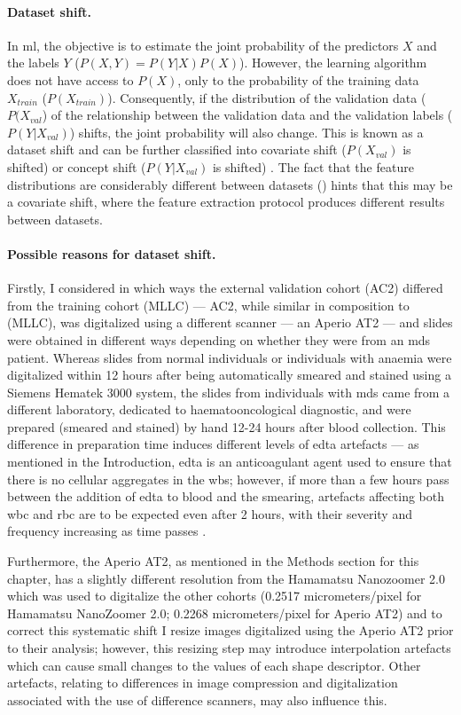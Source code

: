 \paragraph{Dataset shift.} In \ac{ml}, the objective is to estimate the joint probability of the predictors $X$ and the labels $Y$ ($P(X,Y)=P(Y|X)P(X)$). However, the learning algorithm does not have access to $P(X)$, only to the probability of the training data $X_{train}$ ($P(X_{train})$). Consequently, if the distribution of the validation data ($P(X_{val}$) of the relationship between the validation data and the validation labels ($P(Y|X_{val})$) shifts, the joint probability will also change. This is known as a dataset shift and can be further classified into covariate shift ($P(X_{val})$ is shifted) or concept shift ($P(Y|X_{val})$ is shifted) \cite{Y2019-vc}. The fact that the feature distributions are considerably different between datasets () hints that this may be a covariate shift, where the feature extraction protocol produces different results between datasets.

\paragraph{Possible reasons for dataset shift.} Firstly, I considered in which ways the external validation cohort (AC2) differed from the training cohort (MLLC) --- AC2, while similar in composition to (MLLC), was digitalized using a different scanner --- an Aperio AT2 --- and slides were obtained in different ways depending on whether they were from an \ac{mds} patient. Whereas slides from normal individuals or individuals with anaemia were digitalized within 12 hours after being automatically smeared and stained using a Siemens Hematek 3000 system, the slides from individuals with \ac{mds} came from a different laboratory, dedicated to haematooncological diagnostic, and were prepared (smeared and stained) by hand 12-24 hours after blood collection. This difference in preparation time induces different levels of \ac{edta} artefacts --- as mentioned in the Introduction, \ac{edta} is an anticoagulant agent used to ensure that there is no cellular aggregates in the \ac{wbs}; however, if more than a few hours pass between the addition of \ac{edta} to blood and the smearing, artefacts affecting both \ac{wbc} and \ac{rbc} are to be expected even after 2 hours, with their severity and frequency increasing as time passes \cite{Bain2005-zg,Narasimha2008-fh}.

Furthermore, the Aperio AT2, as mentioned in the Methods section for this chapter, has a slightly different resolution from the Hamamatsu Nanozoomer 2.0 which was used to digitalize the other cohorts (0.2517 micrometers/pixel for Hamamatsu NanoZoomer 2.0; 0.2268 micrometers/pixel for Aperio AT2) and to correct this systematic shift I resize images digitalized using the Aperio AT2 prior to their analysis; however, this resizing step may introduce interpolation artefacts which can cause small changes to the values of each shape descriptor. Other artefacts, relating to differences in image compression and digitalization associated with the use of difference scanners, may also influence this.

